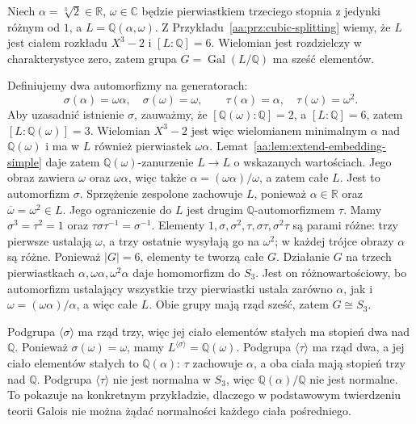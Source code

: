 \begin{przyklad}
\label{aa:prz:cubic-galois-s3}
Niech $\alpha=\sqrt[3]2\in\mathbb R$,
$\omega\in\mathbb C$ będzie pierwiastkiem trzeciego
stopnia z jedynki różnym od $1$, a
$L=\mathbb Q(\alpha,\omega)$. Z
Przykładu~\ref{aa:prz:cubic-splitting} wiemy,
że $L$ jest ciałem rozkładu $X^3-2$ i
$[L:\mathbb Q]=6$. Wielomian jest rozdzielczy
w charakterystyce zero, zatem grupa $G=\operatorname{Gal}(L/\mathbb Q)$
ma sześć elementów.

Definiujemy dwa automorfizmy na generatorach:
\[
\sigma(\alpha)=\omega\alpha,\quad\sigma(\omega)=\omega,
\qquad
\tau(\alpha)=\alpha,\quad\tau(\omega)=\omega^2.
\]
Aby uzasadnić istnienie $\sigma$, zauważmy, że
$[\mathbb Q(\omega):\mathbb Q]=2$, a
$[L:\mathbb Q]=6$, zatem $[L:\mathbb Q(\omega)]=3$.
Wielomian $X^3-2$ jest więc wielomianem minimalnym
$\alpha$ nad $\mathbb Q(\omega)$ i ma w $L$ również
pierwiastek $\omega\alpha$.
Lemat~\ref{aa:lem:extend-embedding-simple} daje zatem
$\mathbb Q(\omega)$-zanurzenie $L\to L$ o wskazanych
wartościach. Jego obraz zawiera $\omega$ oraz
$\omega\alpha$, więc także
$\alpha=(\omega\alpha)/\omega$, a zatem całe $L$.
Jest to automorfizm $\sigma$. Sprzężenie zespolone
zachowuje $L$, ponieważ $\alpha\in\mathbb R$ oraz
$\overline{\omega}=\omega^2\in L$. Jego ograniczenie
do $L$ jest drugim $\mathbb Q$-automorfizmem $\tau$. Mamy
$\sigma^3=\tau^2=1$ oraz
$\tau\sigma\tau^{-1}=\sigma^{-1}$.
Elementy $1,\sigma,\sigma^2,\tau,\sigma\tau,\sigma^2\tau$
są parami różne: trzy pierwsze ustalają $\omega$,
a trzy ostatnie wysyłają go na $\omega^2$;
w każdej trójce obrazy $\alpha$ są różne.
Ponieważ $|G|=6$, elementy te tworzą całe $G$.
Działanie $G$ na trzech pierwiastkach
$\alpha,\omega\alpha,\omega^2\alpha$ daje homomorfizm
do $S_3$. Jest on różnowartościowy, bo automorfizm
ustalający wszystkie trzy pierwiastki ustala zarówno
$\alpha$, jak i $\omega=(\omega\alpha)/\alpha$,
a więc całe $L$. Obie grupy mają rząd sześć,
zatem $G\cong S_3$.

Podgrupa $\langle\sigma\rangle$ ma rząd trzy,
więc jej ciało elementów stałych ma stopień dwa
nad $\mathbb Q$. Ponieważ $\sigma(\omega)=\omega$,
mamy $L^{\langle\sigma\rangle}=\mathbb Q(\omega)$.
Podgrupa $\langle\tau\rangle$ ma rząd dwa,
a jej ciało elementów stałych to $\mathbb Q(\alpha)$:
$\tau$ zachowuje $\alpha$, a oba ciała mają stopień
trzy nad $\mathbb Q$. Podgrupa $\langle\tau\rangle$
nie jest normalna w $S_3$, więc
$\mathbb Q(\alpha)/\mathbb Q$ nie jest normalne.
To pokazuje na konkretnym przykładzie, dlaczego
w podstawowym twierdzeniu teorii Galois nie można
żądać normalności każdego ciała pośredniego.
\end{przyklad}

